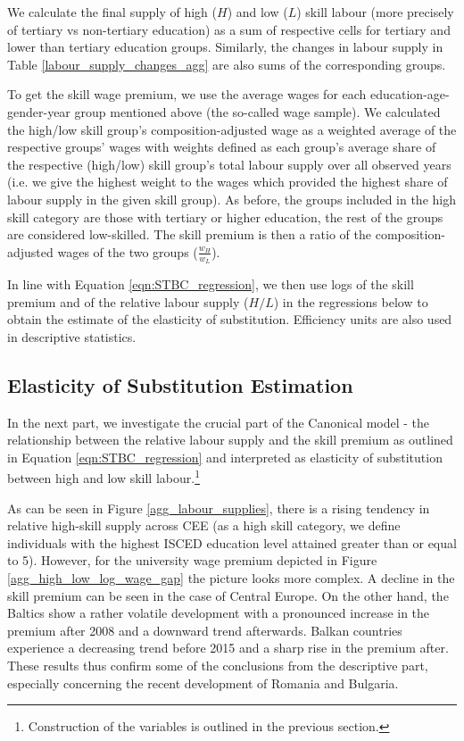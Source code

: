 \documentclass[11pt]{article}
\begin{document}
We calculate the final supply of high ($H$) and low ($L$) skill labour (more precisely of tertiary vs non-tertiary education) as a sum of respective cells for tertiary and lower than tertiary education groups. Similarly, the changes in labour supply in Table \ref{labour_supply_changes_agg} are also sums of the corresponding groups.

To get the skill wage premium, we use the average wages for each education-age-gender-year group mentioned above (the so-called wage sample). We calculated the high/low skill group's composition-adjusted wage as a weighted average of the respective groups' wages with weights defined as each group's average share of the respective (high/low) skill group's total labour supply over all observed years (i.e. we give the highest weight to the wages which provided the highest share of labour supply in the given skill group). As before, the groups included in the high skill category are those with tertiary or higher education, the rest of the groups are considered low-skilled. The skill premium is then a ratio of the composition-adjusted wages of the two groups ($\frac{w_H}{w_L}$).


In line with Equation \ref{eqn:STBC_regression}, we then use logs of the skill premium and of the relative labour supply ($H/L$) in the regressions below to obtain the estimate of the elasticity of substitution. Efficiency units are also used in descriptive statistics.



\subsection{Elasticity of Substitution Estimation}
In the next part, we investigate the crucial part of the Canonical model - the relationship between the relative labour supply and the skill premium as outlined in Equation \ref{eqn:STBC_regression} and interpreted as elasticity of substitution between high and low skill labour.\footnote{Construction of the variables is outlined in the previous section.} 

As can be seen in Figure \ref{agg_labour_supplies}, there is a rising tendency in relative high-skill supply across CEE (as a high skill category, we define individuals with the highest ISCED education level attained greater than or equal to 5). However, for the university wage premium depicted in Figure \ref{agg_high_low_log_wage_gap} the picture looks more complex. A decline in the skill premium can be seen in the case of Central Europe. On the other hand, the Baltics show a rather volatile development with a pronounced increase in the premium after 2008 and a downward trend afterwards. Balkan countries experience a decreasing trend before 2015 and a sharp rise in the premium after. These results thus confirm some of the conclusions from the descriptive part, especially concerning the recent development of Romania and Bulgaria.
\end{document}
